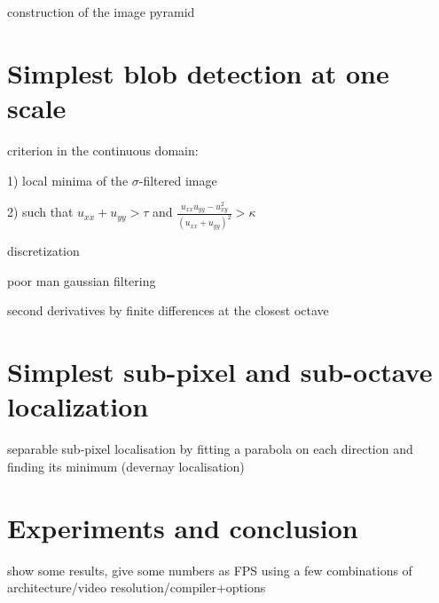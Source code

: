 \documentclass[a4paper]{article}
\begin{document}
construction of the image pyramid

\section{Simplest blob detection at one scale}

criterion in the continuous domain:

1) local minima of the $\sigma$-filtered image

2) such that $u_{xx}+u_{yy} > \tau$ and
$\frac{u_{xx}u_{yy}-u_{xy}^2}{(u_{xx}+u_{yy})^2}>\kappa$

discretization

poor man gaussian filtering

second derivatives by finite differences at the closest octave


\section{Simplest sub-pixel and sub-octave localization}

separable sub-pixel localisation by fitting a parabola on each direction and
finding its minimum (devernay localisation)

\section{Experiments and conclusion}

show some results, give some numbers as FPS using a few combinations of
architecture/video resolution/compiler+options
\end{document}
